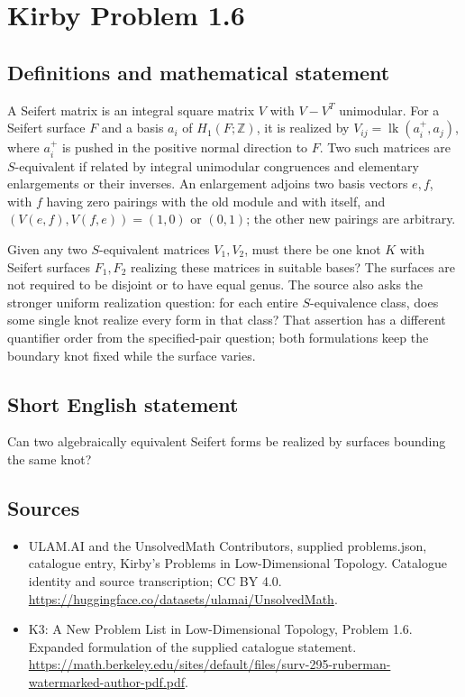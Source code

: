 \documentclass[11pt,a4paper]{article}
\begin{document}
\section*{Kirby Problem 1.6}\label{statement}

\subsection{Definitions and mathematical statement}
A Seifert matrix is an integral square matrix $V$ with $V-V^T$ unimodular. For a
Seifert surface $F$ and a basis $a_i$ of $H_1(F;\mathbb Z)$, it is realized by
$V_{ij}=\operatorname{lk}(a_i^+,a_j)$, where $a_i^+$ is pushed in the positive
normal direction to $F$.
Two such matrices are $S$-equivalent if related by integral unimodular congruences
and elementary enlargements or their inverses. An enlargement adjoins two basis
vectors $e,f$, with $f$ having zero pairings with the old module and with itself,
and $(V(e,f),V(f,e))=(1,0)$ or $(0,1)$; the other new pairings are arbitrary.

Given any two $S$-equivalent matrices $V_1,V_2$, must there be one knot $K$ with
Seifert surfaces $F_1,F_2$ realizing these matrices in suitable bases? The surfaces
are not required to be disjoint or to have equal genus.
The source also asks the stronger uniform realization question: for each entire
$S$-equivalence class, does some single knot realize every form in that class?
That assertion has a different quantifier order from the specified-pair question;
both formulations keep the boundary knot fixed while the surface varies.
\subsection{Short English statement}
Can two algebraically equivalent Seifert forms be realized by surfaces bounding the same knot?
\subsection{Sources}
\begin{itemize}
\item[S1] ULAM.AI and the UnsolvedMath Contributors, supplied problems.json, catalogue entry, Kirby's Problems in Low-Dimensional Topology. Catalogue identity and source transcription; CC BY 4.0.
\url{https://huggingface.co/datasets/ulamai/UnsolvedMath}.
\item[S2] K3: A New Problem List in Low-Dimensional Topology, Problem 1.6. Expanded formulation of the supplied catalogue statement.
\url{https://math.berkeley.edu/sites/default/files/surv-295-ruberman-watermarked-author-pdf.pdf}.
\end{itemize}
\end{document}
